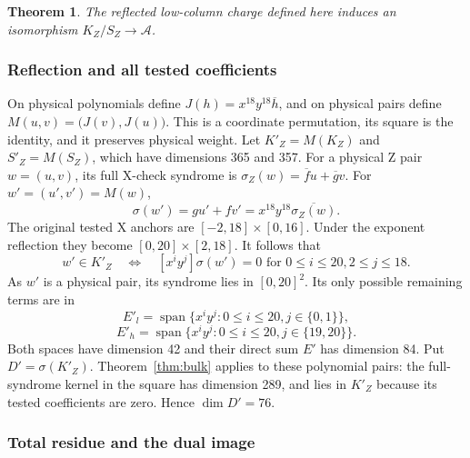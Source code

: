 \documentclass{article}
\newtheorem{theorem}{Theorem}
\DeclareMathOperator{\Span}{span}
\begin{document}
\begin{theorem}\label{thm:z-charge}
  The reflected low-column charge defined here induces an isomorphism
  \(K_Z/S_Z \to \mathcal{A}\).
\end{theorem}

\subsubsection{Reflection and all tested coefficients}\label{app:z-reflection}

On physical polynomials define
\(J(h) = x^{18} y^{18} \overline{h}\), and on physical pairs define
\(M(u,v) = \bigl(J(v), J(u)\bigr)\). This is a coordinate permutation, its square is
the identity, and it preserves physical weight.
Let \(K'_Z = M(K_Z)\) and \(S'_Z = M(S_Z)\), which have dimensions 365 and 357.
For a physical Z pair \(w = (u,v)\), its full X-check syndrome is
\(\sigma_Z(w) = \overline{f} u + \overline{g} v\).
For \(w' = (u', v') = M(w)\),
\begin{equation}
  \sigma(w') = gu' + fv' = x^{18} y^{18} \overline{\sigma_Z(w)}.
\end{equation}
The original tested X anchors are \([-2,18] \times [0,16]\).
Under the exponent reflection they become \([0,20] \times [2,18]\).
It follows that
\begin{equation}
  w' \in K'_Z \quad \Longleftrightarrow \quad
  [x^i y^j] \sigma(w') = 0
  \text{ for } 0 \le i \le 20, 2 \le j \le 18.
\end{equation}
As \(w'\) is a physical pair, its syndrome lies in \([0,20]^2\).
Its only possible remaining terms are in
\begin{equation}
  E'_l = \Span\{x^i y^j : 0 \le i \le 20, j \in \{0,1\}\},
\end{equation}
\begin{equation}
  E'_h = \Span\{x^i y^j : 0 \le i \le 20, j \in \{19,20\}\}.
\end{equation}
Both spaces have dimension 42 and their direct sum \(E'\) has dimension 84.
Put \(D' = \sigma(K'_Z)\). Theorem~\ref{thm:bulk} applies to these polynomial pairs:
the full-syndrome kernel in the square has dimension 289, and lies in
\(K'_Z\) because its tested coefficients are zero. Hence \(\dim D' = 76\).

\subsubsection{Total residue and the dual image}\label{app:z-residue}
\end{document}
